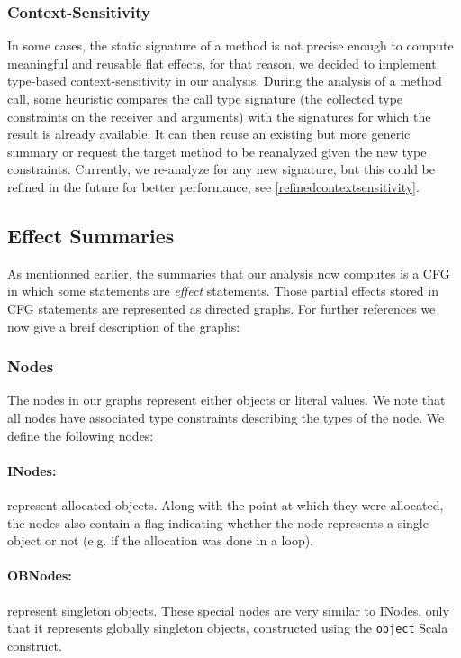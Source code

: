 \documentclass[a4paper]{article}
\begin{document}
\subsubsection{Context-Sensitivity}
In some cases, the static signature of a method is not precise enough to
compute meaningful and reusable flat effects, for that reason, we decided to
implement type-based context-sensitivity in our analysis. During the analysis
of a method call, some heuristic compares the call type signature (the
collected type constraints on the receiver and arguments) with the signatures
for which the result is already available. It can then reuse an existing but
more generic summary or request the target method to be reanalyzed given the new
type constraints. Currently, we re-analyze for any new signature, but this could
be refined in the future for better performance, see
\ref{refinedcontextsensitivity}.

\subsection{Effect Summaries}
As mentionned earlier, the summaries that our analysis now computes is a CFG in
which some statements are \emph{effect} statements. Those partial effects
stored in CFG statements are represented as directed graphs. For further
references we now give a breif description of the graphs:

\subsubsection{Nodes}
The nodes in our graphs represent either objects or literal values. We note
that all nodes have associated type constraints describing the types of the
node. We define the following nodes:

\paragraph{INodes:} represent allocated objects. Along with the point at which
they were allocated, the nodes also contain a flag indicating whether the node
represents a single object or not (e.g. if the allocation was done in a loop).

\paragraph{OBNodes:} represent singleton objects. These special nodes are very
similar to INodes, only that it represents globally singleton objects,
constructed using the \verb=object= Scala construct.
\end{document}
